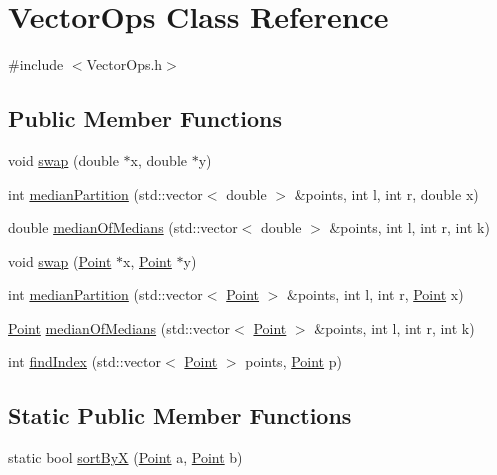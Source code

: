 \hypertarget{classVectorOps}{}\section{Vector\+Ops Class Reference}
\label{classVectorOps}


{\ttfamily \#include $<$Vector\+Ops.\+h$>$}

\subsection*{Public Member Functions}
\begin{DoxyCompactItemize}
\item 
void \hyperlink{classVectorOps_aaa12e98c15826f69b92a7fef41e61db5}{swap} (double $\ast$x, double $\ast$y)
\item 
int \hyperlink{classVectorOps_a3c490fb15256d7fcf0ffdb0a4c316635}{median\+Partition} (std\+::vector$<$ double $>$ \&points, int l, int r, double x)
\item 
double \hyperlink{classVectorOps_a87343d20cbf792b40b99881263c14910}{median\+Of\+Medians} (std\+::vector$<$ double $>$ \&points, int l, int r, int k)
\item 
void \hyperlink{classVectorOps_a86b58d279da36403a22f9fb9ff85dd47}{swap} (\hyperlink{classPoint}{Point} $\ast$x, \hyperlink{classPoint}{Point} $\ast$y)
\item 
int \hyperlink{classVectorOps_a7e1ac242a77ccff184b34807ec85b360}{median\+Partition} (std\+::vector$<$ \hyperlink{classPoint}{Point} $>$ \&points, int l, int r, \hyperlink{classPoint}{Point} x)
\item 
\hyperlink{classPoint}{Point} \hyperlink{classVectorOps_adc2f247b4544a27a48725883298184f5}{median\+Of\+Medians} (std\+::vector$<$ \hyperlink{classPoint}{Point} $>$ \&points, int l, int r, int k)
\item 
int \hyperlink{classVectorOps_a8da0947a76491f3b449b5eb5bb14d2fc}{find\+Index} (std\+::vector$<$ \hyperlink{classPoint}{Point} $>$ points, \hyperlink{classPoint}{Point} p)
\end{DoxyCompactItemize}
\subsection*{Static Public Member Functions}
\begin{DoxyCompactItemize}
\item 
static bool \hyperlink{classVectorOps_a6151f4a74a64dc19d49ed03f8b72291f}{sort\+ByX} (\hyperlink{classPoint}{Point} a, \hyperlink{classPoint}{Point} b)
\end{DoxyCompactItemize}


